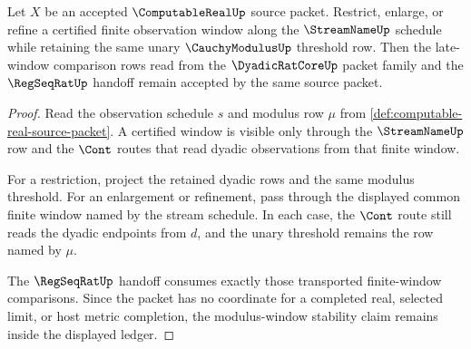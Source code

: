 \begin{theorem}
\label{thm:computable-real-modulus-window-stability}
Let $X$ be an accepted $\ComputableRealUp$ source packet. Restrict, enlarge,
or refine a certified finite observation window along the $\StreamNameUp$
schedule while retaining the same unary $\CauchyModulusUp$ threshold row.
Then the late-window comparison rows read from the $\DyadicRatCoreUp$ packet
family and the $\RegSeqRatUp$ handoff remain accepted by the same source
packet.
\end{theorem}
\begin{proof}
Read the observation schedule $s$ and modulus row $\mu$ from
\autoref{def:computable-real-source-packet}. A certified window is visible
only through the $\StreamNameUp$ row and the $\Cont$ routes that read dyadic
observations from that finite window.

For a restriction, project the retained dyadic rows and the same modulus
threshold. For an enlargement or refinement, pass through the displayed common
finite window named by the stream schedule. In each case, the $\Cont$ route
still reads the dyadic endpoints from $d$, and the unary threshold remains
the row named by $\mu$.

The $\RegSeqRatUp$ handoff consumes exactly those transported finite-window
comparisons. Since the packet has no coordinate for a completed real, selected
limit, or host metric completion, the modulus-window stability claim remains
inside the displayed ledger.
\end{proof}


